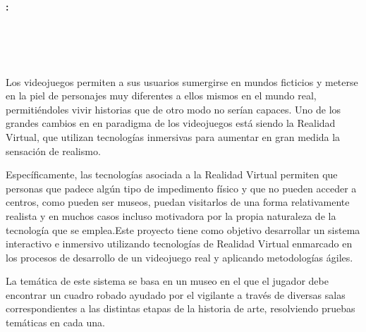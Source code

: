 \chapter*{}



\cleardoublepage
\thispagestyle{empty}

\copyrightpage

\begin{center}
{\large\bfseries \myTitle: \mySubtitle}\\
\end{center}

\begin{center}
\myName \\
\end{center}

\vspace{0.7cm}
\\

\vspace{0.7cm}
\\

Los videojuegos permiten a sus usuarios sumergirse en mundos ficticios y meterse en la piel de personajes muy diferentes a ellos mismos en el mundo real, permitiéndoles vivir historias que de otro modo no serían capaces. Uno de los grandes cambios en en paradigma de los videojuegos está siendo la Realidad Virtual, que utilizan tecnologías inmersivas para aumentar en gran medida la sensación de realismo.

\bigskip

Específicamente, las tecnologías asociada a la Realidad Virtual permiten que personas que padece algún tipo de impedimento físico y que no pueden acceder a centros, como pueden ser museos, puedan visitarlos de una forma relativamente realista y en muchos casos incluso motivadora por la propia naturaleza de la tecnología que se emplea.Este proyecto tiene como objetivo desarrollar un sistema interactivo e inmersivo utilizando tecnologías de Realidad Virtual enmarcado en los procesos de desarrollo de un videojuego real y aplicando metodologías ágiles.

\bigskip

La temática de este sistema se basa en un museo en el que el jugador debe encontrar un cuadro robado ayudado por el vigilante a través de diversas salas correspondientes a las distintas etapas de la historia de arte, resolviendo pruebas temáticas en cada una.

